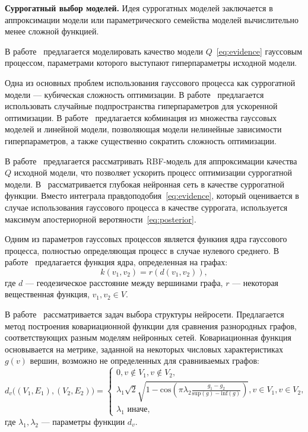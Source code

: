 \textbf{Суррогатный выбор моделей. }
Идея суррогатных моделей заключается в аппроксимации модели или параметрического семейства моделей вычислительно менее сложной функцией.

В работе~\cite{bo_gp} предлагается моделировать качество модели $Q$~\eqref{eq:evidence} гауссовым процессом, параметрами которого выступают гиперпараметры исходной модели.

Одна из основных проблем использования гауссового процесса как суррогатной модели --- кубическая сложность оптимизации. В работе~\cite{random_gaus} предлагается использовать случайные подпространства гиперпараметров для ускоренной оптимизации.  В работе~\cite{gp_tree} предлагается кобминация из множества гауссовых моделей и линейной модели, позволяющая модели нелинейные зависимости гиперпараметров, а также существенно сократить сложность оптимизации. 

В работе~\cite{rbf_surrogate} предлагается рассматривать RBF-модель для аппроксимации качества $Q$ исходной модели, что позволяет ускорить процесс оптимизации суррогатной модели. В~\cite{snoek_deep} рассматривается глубокая нейронная сеть в качестве суррогатной функции. Вместо интеграла правдоподобия~\eqref{eq:evidence}, который оценивается в случае использования гауссового процесса в качестве суррогата, используется максимум апостериорной веротяности~\eqref{eq:posterior}.

Одним из параметров гауссовых процессов является функиия ядра гауссового процесса, полностью определяющая процесс в случае нулевого среднего. В работе~\cite{gp_fusion} предлагается функция ядра, определенная на графах:
    \[
    k(v_1,v_2) = r(d(v_1,v_2)),
    \]
где $d$ --- геодезическое расстояние между вершинами графа, $r$ --- некоторая вещественная функция, $v_1, v_2 \in V$.

В работе~\cite{gp_arc} рассматривается задач выбора структуры нейросети. Предлагается метод построения ковариационной функции для сравнения разнородных графов, соответствующих разным моделям нейронных сетей. Ковариационная функция основывается на метрике, заданной на некоторых числовых характеристиках $g(v)$ вершин, возможно не определенных для сравниваемых графов:
\[
    d_v\bigl( (V_1, E_1), (V_2,E_2) \bigr) = \begin{cases}
    0, v \not \in V_1, v \not \in V_2,\\    
    \lambda_1\sqrt{2}\sqrt{1- \text{cos}(\pi\lambda_2\frac{g_1 - g_2}{\text{sup}(g) - \text{inf}(g) })}, v \in V_1, v \in V_2,\\
    \lambda_1 \text{ иначе,}
    \end{cases}
\]
где $\lambda_1, \lambda_2$ --- параметры функции $d_v$.

